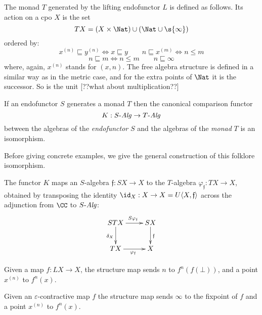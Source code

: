\documentclass[11pt,a4paper]{article}
\newcommand{\tuple}[1]{\langle #1 \rangle }
\renewcommand{\alg}[1]{#1 \mbox{-\textit{Alg}}}
\newcommand{\isom}[1]{\varphi_{#1}}
\newcommand{\ti}{T}
\newcommand{\esse}{S}
\newcommand{\f}{\mathfrak{f}}
\newcommand{\g}{\mathfrak{g}}
\newcommand{\computation}[2]{#2^{(#1)}}
\newcommand{\order}{\sqsubseteq}
\begin{document}
\begin{example}
  The monad $T$ generated by the lifting endofunctor $L$ is
  defined as follows.  Its action on a cpo $X$ is the set
  $$\ti X = (X\times \Nat ) \cup (\Nat \cup \s{\infty})$$
  ordered by:
$$
\computation{n}{x} \order \computation{n}{y}\iff x\order y \qquad
n \order \computation{m}{x} \iff n \leq m
$$
$$
n\order m \iff n \leq m \qquad n \order \infty
$$
where, again, $\computation{n}{x}$ stands for $(x,n)$.
The free algebra structure is defined in a similar way as in the
metric case, and for the extra points of $\Nat$ it is the
successor. So is the unit [??what about multiplication??]
\end{example}

\begin{proposition}
If an endofunctor $\esse$ generates a monad $\ti$
then the canonical comparison functor
$$K:\alg{\esse} \rightarrow \alg{\ti}$$
between the algebras of the \emph{endofunctor} $\esse$ and
the algebras of the \emph{monad} $\ti$ is an isomorphism.
%
\close
\end{proposition}
Before giving concrete examples, we give the general construction of
this folklore isomorphism.

The functor $K$ maps an $\esse$-algebra $\f: \esse X \rightarrow X$ to
the $\ti$-algebra $\isom{\f} : TX \rightarrow X$, obtained by
transposing the identity $\id_X :X\rightarrow X =U\tuple{X,\f}$ across
the adjunction from $\CC$ to $\alg{\esse}$:
\begin{equation}
  \label{eq:kappa}
  \xymatrix{
{\esse TX} \ar[d]_{\delta_X} \ar[r]^{\esse \isom{\f}} 
     & {\esse X} \ar[d]^{\f}
\\
TX \ar[r]_{\isom{\f}} &  X
}
\end{equation}

\begin{example}
Given a map $f:LX\rightarrow X$, the structure map sends
$n$ to $f^n (f(\bot ))$, 
and a point $\computation{n}{x}$ to $f^n (x)$.
\end{example}

\begin{example}
  Given an $\varepsilon$-contractive map $f$
the structure map sends $\infty$ to the fixpoint of $f$
and a point $\computation{n}{x}$ to $f^n (x)$.
\end{example}
\end{document}
